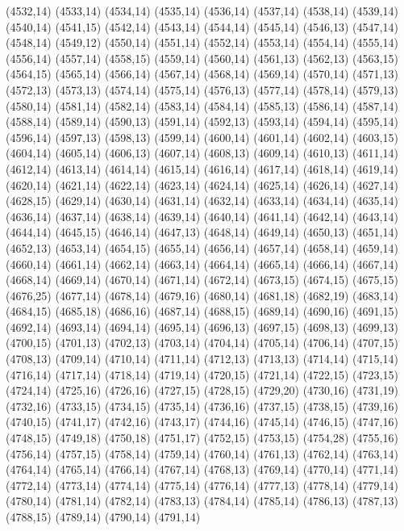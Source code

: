 (4532,14)
(4533,14)
(4534,14)
(4535,14)
(4536,14)
(4537,14)
(4538,14)
(4539,14)
(4540,14)
(4541,15)
(4542,14)
(4543,14)
(4544,14)
(4545,14)
(4546,13)
(4547,14)
(4548,14)
(4549,12)
(4550,14)
(4551,14)
(4552,14)
(4553,14)
(4554,14)
(4555,14)
(4556,14)
(4557,14)
(4558,15)
(4559,14)
(4560,14)
(4561,13)
(4562,13)
(4563,15)
(4564,15)
(4565,14)
(4566,14)
(4567,14)
(4568,14)
(4569,14)
(4570,14)
(4571,13)
(4572,13)
(4573,13)
(4574,14)
(4575,14)
(4576,13)
(4577,14)
(4578,14)
(4579,13)
(4580,14)
(4581,14)
(4582,14)
(4583,14)
(4584,14)
(4585,13)
(4586,14)
(4587,14)
(4588,14)
(4589,14)
(4590,13)
(4591,14)
(4592,13)
(4593,14)
(4594,14)
(4595,14)
(4596,14)
(4597,13)
(4598,13)
(4599,14)
(4600,14)
(4601,14)
(4602,14)
(4603,15)
(4604,14)
(4605,14)
(4606,13)
(4607,14)
(4608,13)
(4609,14)
(4610,13)
(4611,14)
(4612,14)
(4613,14)
(4614,14)
(4615,14)
(4616,14)
(4617,14)
(4618,14)
(4619,14)
(4620,14)
(4621,14)
(4622,14)
(4623,14)
(4624,14)
(4625,14)
(4626,14)
(4627,14)
(4628,15)
(4629,14)
(4630,14)
(4631,14)
(4632,14)
(4633,14)
(4634,14)
(4635,14)
(4636,14)
(4637,14)
(4638,14)
(4639,14)
(4640,14)
(4641,14)
(4642,14)
(4643,14)
(4644,14)
(4645,15)
(4646,14)
(4647,13)
(4648,14)
(4649,14)
(4650,13)
(4651,14)
(4652,13)
(4653,14)
(4654,15)
(4655,14)
(4656,14)
(4657,14)
(4658,14)
(4659,14)
(4660,14)
(4661,14)
(4662,14)
(4663,14)
(4664,14)
(4665,14)
(4666,14)
(4667,14)
(4668,14)
(4669,14)
(4670,14)
(4671,14)
(4672,14)
(4673,15)
(4674,15)
(4675,15)
(4676,25)
(4677,14)
(4678,14)
(4679,16)
(4680,14)
(4681,18)
(4682,19)
(4683,14)
(4684,15)
(4685,18)
(4686,16)
(4687,14)
(4688,15)
(4689,14)
(4690,16)
(4691,15)
(4692,14)
(4693,14)
(4694,14)
(4695,14)
(4696,13)
(4697,15)
(4698,13)
(4699,13)
(4700,15)
(4701,13)
(4702,13)
(4703,14)
(4704,14)
(4705,14)
(4706,14)
(4707,15)
(4708,13)
(4709,14)
(4710,14)
(4711,14)
(4712,13)
(4713,13)
(4714,14)
(4715,14)
(4716,14)
(4717,14)
(4718,14)
(4719,14)
(4720,15)
(4721,14)
(4722,15)
(4723,15)
(4724,14)
(4725,16)
(4726,16)
(4727,15)
(4728,15)
(4729,20)
(4730,16)
(4731,19)
(4732,16)
(4733,15)
(4734,15)
(4735,14)
(4736,16)
(4737,15)
(4738,15)
(4739,16)
(4740,15)
(4741,17)
(4742,16)
(4743,17)
(4744,16)
(4745,14)
(4746,15)
(4747,16)
(4748,15)
(4749,18)
(4750,18)
(4751,17)
(4752,15)
(4753,15)
(4754,28)
(4755,16)
(4756,14)
(4757,15)
(4758,14)
(4759,14)
(4760,14)
(4761,13)
(4762,14)
(4763,14)
(4764,14)
(4765,14)
(4766,14)
(4767,14)
(4768,13)
(4769,14)
(4770,14)
(4771,14)
(4772,14)
(4773,14)
(4774,14)
(4775,14)
(4776,14)
(4777,13)
(4778,14)
(4779,14)
(4780,14)
(4781,14)
(4782,14)
(4783,13)
(4784,14)
(4785,14)
(4786,13)
(4787,13)
(4788,15)
(4789,14)
(4790,14)
(4791,14)
